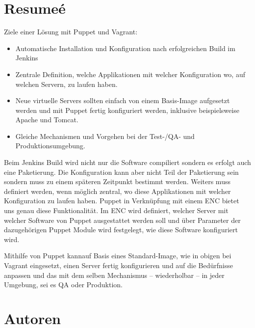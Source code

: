 \documentclass[12pt,a4paper,ngerman]{article}
\begin{document}
\section{Resumeé}

Ziele einer Lösung mit Puppet und Vagrant:
\begin{itemize}
\item Automatische Installation und Konfiguration nach erfolgreichen Build im Jenkins 
\item Zentrale Definition, welche Applikationen mit welcher Konfiguration wo, auf welchen Servern, zu laufen haben.
\item Neue virtuelle Servers sollten einfach von einem Basis-Image aufgesetzt werden und mit Puppet fertig konfiguriert werden, inklusive beispielsweise Apache und Tomcat.
\item Gleiche Mechanismen und Vorgehen bei der Test-/QA- und Produktionsumgebung.
\end{itemize}

Beim Jenkins Build wird nicht nur die Software compiliert sondern es erfolgt auch eine Paketierung.  Die Konfiguration kann aber nicht Teil der Paketierung sein sondern muss zu einem späteren Zeitpunkt bestimmt werden. Weiters muss definiert werden, wenn möglich zentral, wo diese Applikationen mit welcher Konfiguration zu laufen haben. Puppet in Verknüpfung mit einem ENC bietet uns genau diese Funktionalität. Im ENC wird definiert, welcher Server mit welcher Software von Puppet ausgestattet werden soll und über Parameter der dazugehörigen Puppet Module wird festgelegt, wie diese Software konfiguriert wird. 

Mithilfe von Puppet kannauf Basis eines Standard-Image, wie in obigen bei Vagrant eingesetzt, einen Server fertig konfigurieren und auf die Bedürfnisse anpassen und das mit dem selben Mechanismus -- wiederholbar -- in jeder Umgebung, sei es QA oder Produktion.

\section*{Autoren}
\end{document}
